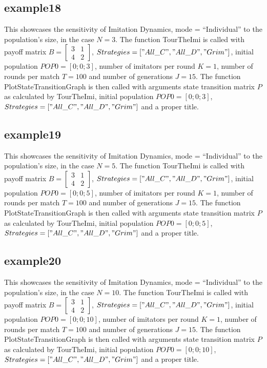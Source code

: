 \subsection{example18}
This showcases the sensitivity of Imitation Dynamics, mode = ``Individual'' to the population's size, in the case $N=3$. The function TourTheImi is called with payoff matrix $B = \begin{bmatrix} 3 & 1 \\ 4 & 2 \end{bmatrix}$, $Strategies = ["All\_C", "All\_D", "Grim"]$, initial population $POP0 = [0; 0; 3]$, number of imitators per round $K=1$, number of rounds per match $T = 100$ and number of generations $J = 15$. The function PlotStateTransitionGraph is then called with arguments state transition matrix $P$ as calculated by TourTheImi, initial population $POP0 = [0; 0; 3]$, $Strategies = ["All\_C", "All\_D", "Grim"]$ and a proper title.

\subsection{example19}
This showcases the sensitivity of Imitation Dynamics, mode = ``Individual'' to the population's size, in the case $N=5$. The function TourTheImi is called with payoff matrix $B = \begin{bmatrix} 3 & 1 \\ 4 & 2 \end{bmatrix}$, $Strategies = ["All\_C", "All\_D", "Grim"]$, initial population $POP0 = [0; 0; 5]$, number of imitators per round $K=1$, number of rounds per match $T = 100$ and number of generations $J = 15$. The function PlotStateTransitionGraph is then called with arguments state transition matrix $P$ as calculated by TourTheImi, initial population $POP0 = [0; 0; 5]$, $Strategies = ["All\_C", "All\_D", "Grim"]$ and a proper title.

\subsection{example20}
This showcases the sensitivity of Imitation Dynamics, mode = ``Individual'' to the population's size, in the case $N=10$. The function TourTheImi is called with payoff matrix $B = \begin{bmatrix} 3 & 1 \\ 4 & 2 \end{bmatrix}$, $Strategies = ["All\_C", "All\_D", "Grim"]$, initial population $POP0 = [0; 0; 10]$, number of imitators per round $K=1$, number of rounds per match $T = 100$ and number of generations $J = 15$. The function PlotStateTransitionGraph is then called with arguments state transition matrix $P$ as calculated by TourTheImi, initial population $POP0 = [0; 0; 10]$, $Strategies = ["All\_C", "All\_D", "Grim"]$ and a proper title.

